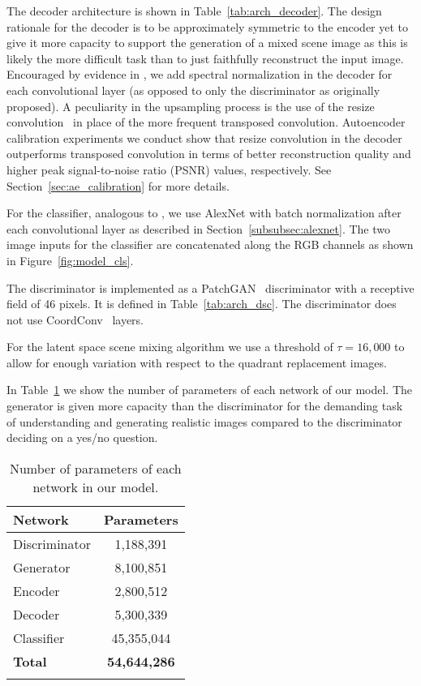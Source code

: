 \documentclass[a4paper,12pt]{report}
\begin{document}
The decoder architecture is shown in Table~\ref{tab:arch_decoder}. The design rationale for the decoder is to be approximately symmetric to the encoder yet to give it more capacity to support the generation of a mixed scene image as this is likely the more difficult task than to just faithfully reconstruct the input image. Encouraged by evidence in \cite{SAGAN}, we add spectral normalization in the decoder for each convolutional layer (as opposed to only the discriminator as originally proposed). A peculiarity in the upsampling process is the use of the resize convolution~\cite{ResizeConv} in place of the more frequent transposed convolution. Autoencoder calibration experiments we conduct show that resize convolution in the decoder outperforms transposed convolution in terms of better reconstruction quality and higher peak signal-to-noise ratio (PSNR) values, respectively. See Section~\ref{sec:ae_calibration} for more details.




For the classifier, analogous to \cite{DisentFacOfVarByMixTh}, we use AlexNet with batch normalization after each convolutional layer as described in Section~\ref{subsubsec:alexnet}. The two image inputs for the classifier are concatenated along the RGB channels as shown in  Figure~\ref{fig:model_cls}.

The discriminator is implemented as a PatchGAN~\cite{CondGAN_PatchGAN} discriminator with a receptive field of 46 pixels. It is defined in Table~\ref{tab:arch_dsc}. The discriminator does not use CoordConv~\cite{CoordConv} layers.



For the latent space scene mixing algorithm we use a threshold of $\tau = 16,000$ to allow for enough variation with respect to the quadrant replacement images.

In Table~\ref{tab:params} we show the number of parameters of each network of our model. The generator is given more capacity than the discriminator for the demanding task of understanding and generating realistic images compared to the discriminator deciding on a yes/no question.
\begin{table} [ht!]
\centering
\begin{tabular}{l|c}
\Xhline{0.8pt}
\textbf{Network} & \textbf{Parameters}\\
\hline
Discriminator & 1,188,391 \\
\hline
Generator & 8,100,851 \\
\quad Encoder & 2,800,512 \\
\quad Decoder & 5,300,339 \\
\hline
Classifier & 45,355,044 \\
\hline
\textbf{Total} & \textbf{54,644,286} \\
\Xhline{0.8pt}
\end{tabular}
\caption{Number of parameters of each network in our model.} \label{tab:params}
\end{table}
\end{document}
